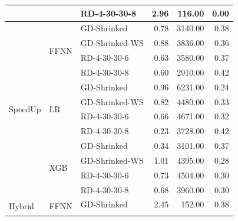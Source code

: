 \begin{table}[ht]
\begin{tabular}{lllrrr}
		                          &                       & RD-4-30-30-8     & 2.96         & 116.00              & 0.00                    \\\hline
		\multirow{12}{*}{SpeedUp} & \multirow{4}{*}{FFNN} & GD-Shrinked      & 0.78         & 3140.00             & 0.38                    \\\cline{3-6}
		                          &                       & GD-Shrinked-WS   & 0.88         & 3836.00             & 0.36                    \\\cline{3-6}
		                          &                       & RD-4-30-30-6     & 0.63         & 3580.00             & 0.37                    \\\cline{3-6}
		                          &                       & RD-4-30-30-8     & 0.60         & 2910.00             & 0.42                    \\\cline{2-6}
		                          & \multirow{4}{*}{LR}   & GD-Shrinked      & 0.96         & 6231.00             & 0.24                    \\\cline{3-6}
		                          &                       & GD-Shrinked-WS   & 0.82         & 4480.00             & 0.33                    \\\cline{3-6}
		                          &                       & RD-4-30-30-6     & 0.66         & 4671.00             & 0.32                    \\\cline{3-6}
		                          &                       & RD-4-30-30-8     & 0.23         & 3728.00             & 0.42                    \\\cline{2-6}
		                          & \multirow{4}{*}{XGB}  & GD-Shrinked      & 0.34         & 3101.00             & 0.37                    \\\cline{3-6}
		                          &                       & GD-Shrinked-WS   & 1.01         & 4395.00             & 0.28                    \\\cline{3-6}
		                          &                       & RD-4-30-30-6     & 0.73         & 4504.00             & 0.30                    \\\cline{3-6}
		                          &                       & RD-4-30-30-8     & 0.68         & 3960.00             & 0.30                    \\\hline
		\multirow{12}{*}{Hybrid}  & \multirow{4}{*}{FFNN} & GD-Shrinked      & 2.45         & 152.00              & 0.38                    \\\cline{3-6}

\end{tabular}
\end{table}

